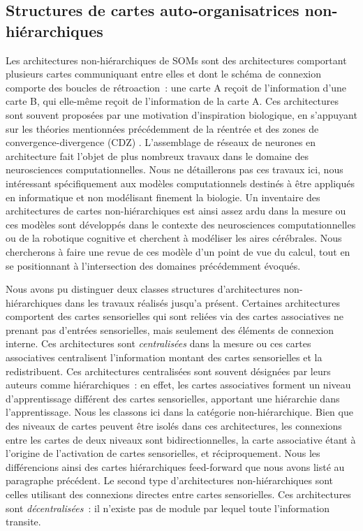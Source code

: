 \documentclass[../main]{subfiles}
\begin{document}
\subsection{Structures de cartes auto-organisatrices non-hiérarchiques}

Les architectures non-hiérarchiques de SOMs sont des architectures comportant plusieurs cartes communiquant entre elles et dont le schéma de connexion comporte des boucles de rétroaction~: une carte A reçoit de l'information d'une carte B, qui elle-même reçoit de l'information de la carte A.
Ces architectures sont souvent proposées par une motivation d'inspiration biologique, en s'appuyant sur les théories mentionnées précédemment de la réentrée \cite{Edelman1982GroupSA} et des zones de convergence-divergence (CDZ) \cite{damasio_time-locked_1989}.
L'assemblage de réseaux de neurones en architecture fait l'objet de plus nombreux travaux dans le domaine des neurosciences computationnelles. Nous ne détaillerons pas ces travaux ici, nous intéressant spécifiquement aux modèles computationnels destinés à être appliqués en informatique et non modélisant finement la biologie.
Un inventaire des architectures de cartes non-hiérarchiques est ainsi assez ardu dans la mesure ou ces modèles sont développés dans le contexte des neurosciences computationnelles ou de la robotique cognitive et cherchent à modéliser les aires cérébrales. 
Nous chercherons à faire une revue de ces modèle d'un point de vue du calcul, tout en se positionnant à l'intersection des domaines précédemment évoqués.

Nous avons pu distinguer deux classes structures d'architectures non-hiérarchiques dans les travaux réalisés jusqu'a présent.
Certaines architectures comportent des cartes sensorielles qui sont reliées via des cartes associatives ne prenant pas d'entrées sensorielles, mais seulement des éléments de connexion interne. Ces architectures sont \emph{centralisées} dans la mesure ou ces cartes associatives centralisent l'information  montant des cartes sensorielles et la redistribuent. Ces architectures centralisées sont souvent désignées par leurs auteurs comme hiérarchiques~: en effet, les cartes associatives forment un niveau d'apprentissage différent des cartes sensorielles, apportant une hiérarchie dans l'apprentissage. Nous les classons ici dans la catégorie non-hiérarchique. Bien que des niveaux de cartes peuvent être isolés dans ces architectures, les connexions entre les cartes de deux niveaux sont bidirectionnelles, la carte associative étant à l'origine de l'activation de cartes sensorielles, et réciproquement.
Nous les différencions ainsi des cartes hiérarchiques feed-forward que nous avons listé au paragraphe précédent.
Le second type d'architectures non-hiérarchiques sont celles utilisant des connexions directes entre cartes sensorielles. Ces architectures sont \emph{décentralisées}~: il n'existe pas de module par lequel toute l'information transite.
\end{document}
